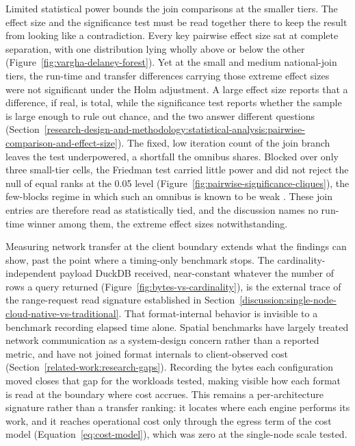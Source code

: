 Limited statistical power bounds the join comparisons at the smaller tiers. The effect size and the significance test must be read together there to keep the result from looking like a contradiction. Every key pairwise effect size sat at complete separation, with one distribution lying wholly above or below the other (Figure~\ref{fig:vargha-delaney-forest}). Yet at the small and medium national-join tiers, the run-time and transfer differences carrying those extreme effect sizes were not significant under the Holm adjustment. A large effect size reports that a difference, if real, is total, while the significance test reports whether the sample is large enough to rule out chance, and the two answer different questions \parencite{arcuri2014_hitchhiker_statistical_tests} (Section~\ref{research-design-and-methodology:statistical-analysis:pairwise-comparison-and-effect-size}). The fixed, low iteration count of the join branch leaves the test underpowered, a shortfall the omnibus shares. Blocked over only three small-tier cells, the Friedman test carried little power and did not reject the null of equal ranks at the \num{0.05} level (Figure~\ref{fig:pairwise-significance-cliques}), the few-blocks regime in which such an omnibus is known to be weak \parencite{demsar2006_statistical_comparisons_classifiers}. These join entries are therefore read as statistically tied, and the discussion names no run-time winner among them, the extreme effect sizes notwithstanding.

Measuring network transfer at the client boundary extends what the findings can show, past the point where a timing-only benchmark stops. The cardinality-independent payload DuckDB received, near-constant whatever the number of rows a query returned (Figure~\ref{fig:bytes-vs-cardinality}), is the external trace of the range-request read signature established in Section~\ref{discussion:single-node-cloud-native-vs-traditional}. That format-internal behavior is invisible to a benchmark recording elapsed time alone. Spatial benchmarks have largely treated network communication as a system-design concern rather than a reported metric, and have not joined format internals to client-observed cost \parencite{tang2020_locationspark_distributed_spatial_query,folkerts2012_benchmarking_in_the_cloud} (Section~\ref{related-work:research-gaps}). Recording the bytes each configuration moved closes that gap for the workloads tested, making visible how each format is read at the boundary where cost accrues. This remains a per-architecture signature rather than a transfer ranking: it locates where each engine performs its work, and it reaches operational cost only through the egress term of the cost model (Equation~\ref{eq:cost-model}), which was zero at the single-node scale tested.

